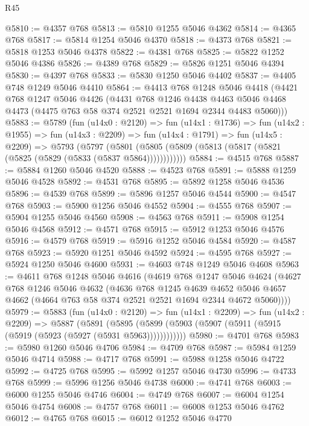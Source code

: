 \begin{lexlean}{R45}
\begin{coremodule}
@5810 := @4357 @768
@5813 := @5810 @1255 @5046 @4362
@5814 := @4365 @768
@5817 := @5814 @1254 @5046 @4370
@5818 := @4373 @768
@5821 := @5818 @1253 @5046 @4378
@5822 := @4381 @768
@5825 := @5822 @1252 @5046 @4386
@5826 := @4389 @768
@5829 := @5826 @1251 @5046 @4394
@5830 := @4397 @768
@5833 := @5830 @1250 @5046 @4402
@5837 := @4405 @748 @1249 @5046 @4410
@5864 := @4413
    @768
    @1248
    @5046
    @4418
    (@4421
      @768
      @1247
      @5046
      @4426
      (@4431
        @768
        @1246
        @4438
        @4463
        @5046
        @4468
        @4473
        (@4475 @763 @58 @374 @2521 @2521 @1694 @2344 @4483 @5060)))
@5883 := @5789
    (fun (u14x0 : @2120) =>
    fun (u14x1 : @1736) =>
    fun (u14x2 : @1955) =>
    fun (u14x3 : @2209) =>
    fun (u14x4 : @1791) =>
    fun (u14x5 : @2209) =>
    @5793
      (@5797 (@5801 (@5805 (@5809 (@5813 (@5817 (@5821 (@5825 (@5829 (@5833 (@5837 @5864))))))))))))
@5884 := @4515 @768
@5887 := @5884 @1260 @5046 @4520
@5888 := @4523 @768
@5891 := @5888 @1259 @5046 @4528
@5892 := @4531 @768
@5895 := @5892 @1258 @5046 @4536
@5896 := @4539 @768
@5899 := @5896 @1257 @5046 @4544
@5900 := @4547 @768
@5903 := @5900 @1256 @5046 @4552
@5904 := @4555 @768
@5907 := @5904 @1255 @5046 @4560
@5908 := @4563 @768
@5911 := @5908 @1254 @5046 @4568
@5912 := @4571 @768
@5915 := @5912 @1253 @5046 @4576
@5916 := @4579 @768
@5919 := @5916 @1252 @5046 @4584
@5920 := @4587 @768
@5923 := @5920 @1251 @5046 @4592
@5924 := @4595 @768
@5927 := @5924 @1250 @5046 @4600
@5931 := @4603 @748 @1249 @5046 @4608
@5963 := @4611
    @768
    @1248
    @5046
    @4616
    (@4619
      @768
      @1247
      @5046
      @4624
      (@4627
        @768
        @1246
        @5046
        @4632
        (@4636
          @768
          @1245
          @4639
          @4652
          @5046
          @4657
          @4662
          (@4664 @763 @58 @374 @2521 @2521 @1694 @2344 @4672 @5060))))
@5979 := @5883
    (fun (u14x0 : @2120) =>
    fun (u14x1 : @2209) =>
    fun (u14x2 : @2209) =>
    @5887
      (@5891 (@5895 (@5899 (@5903 (@5907 (@5911 (@5915 (@5919 (@5923 (@5927 (@5931 @5963))))))))))))
@5980 := @4701 @768
@5983 := @5980 @1260 @5046 @4706
@5984 := @4709 @768
@5987 := @5984 @1259 @5046 @4714
@5988 := @4717 @768
@5991 := @5988 @1258 @5046 @4722
@5992 := @4725 @768
@5995 := @5992 @1257 @5046 @4730
@5996 := @4733 @768
@5999 := @5996 @1256 @5046 @4738
@6000 := @4741 @768
@6003 := @6000 @1255 @5046 @4746
@6004 := @4749 @768
@6007 := @6004 @1254 @5046 @4754
@6008 := @4757 @768
@6011 := @6008 @1253 @5046 @4762
@6012 := @4765 @768
@6015 := @6012 @1252 @5046 @4770

\end{coremodule}
\end{lexlean}
